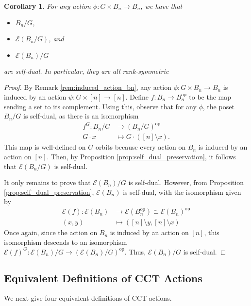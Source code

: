 \documentclass[smallextended, envcountsame, numbook]{svjour3}
\theoremstyle{plain}
\newtheorem{cor}[thm]{Corollary}
\theoremstyle{definition}
\theoremstyle{remark}
\numberwithin{equation}{section}
\newcommand\ssec{\subsection}
\newcommand\op{\operatorname{op}}
\begin{document}
\begin{cor}
\label{cor:duality_bn_quotients}
For any action $\phi\colon G \times B_n \rightarrow B_n$, we have that
\begin{itemize}
	\item $B_n/G$,
	\item $\mathcal E(B_n/G)$, and
	\item $\mathcal E(B_n)/G$
\end{itemize} are self-dual. In particular, they are all rank-symmetric 
\end{cor}
\begin{proof}
	By Remark \ref{rem:induced_action_bn}, any action $\phi\colon G\times B_n \rightarrow B_n$ is induced by an action $\psi\colon G \times [n] \rightarrow [n]$. 
	Define $f: B_n \rightarrow B_n^{\op}$ to be the map sending a set to its complement.
	Using this, observe that for any $\phi$, the poset $B_n/G$ is self-dual, as there is an isomorphism 
\begin{align*}
	f^G \colon B_n/G &\rightarrow (B_n/G)^{\op} \\
	G \cdot x &\mapsto G \cdot ([n] \setminus x).
\end{align*}
This map is well-defined on $G$ orbits because every action on $B_n$ is induced by an action on $[n]$. Then, by Proposition \ref{prop:self_dual_preservation}, it follows that $\mathcal E(B_n/G)$ is self-dual.

It only remains to prove that $\mathcal E(B_n)/G$ is self-dual. However, from Proposition \ref{prop:self_dual_preservation}, $\mathcal E(B_n)$ is self-dual, with the isomorphism given by 
\begin{align*}
	\mathcal E(f)\colon\mathcal E(B_n) & \rightarrow \mathcal E(B_n^{\op}) \cong \mathcal E(B_n)^{\op}\\
	(x,y) & \mapsto ([n]\setminus y,[n] \setminus x) 
\end{align*}
\noindent
Once again, since the action on $B_n$ is induced by an action on $[n]$, this isomorphism descends to an isomorphism $\mathcal E(f)^G\colon\mathcal E(B_n)/G \rightarrow  (\mathcal{E}(B_n)/G)^{\op}$. Thus, $\mathcal E(B_n)/G$ is self-dual.
\end{proof}

\ssec{Equivalent Definitions of CCT Actions}
\label{ssec:equivalent_defs}

We next give four equivalent definitions of CCT actions. 
\end{document}
